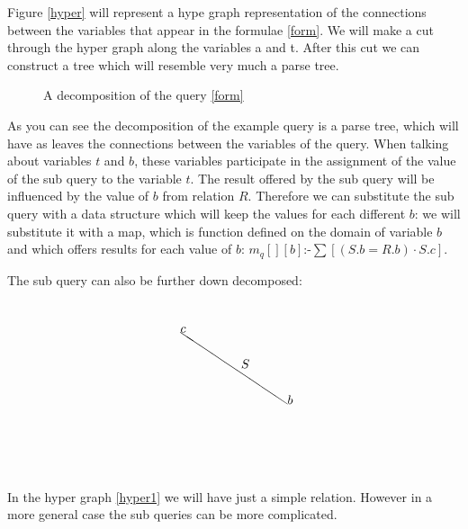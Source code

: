 \documentclass[12pt]{article}
\begin{document}
Figure \ref{hyper} will represent a hype graph representation of the connections between the variables that appear in the formulae \ref{form}. We will make a cut through the hyper graph along the variables a and t. After this cut we can construct a tree which will resemble very much a parse tree.

\begin{figure}[htbp]
\begin{center}
\usetikzlibrary{fit}
\end{center}
\caption{A decomposition of the query \ref{form}}
\label{figtree}
\end{figure}

As you can see the decomposition of the example query is a parse tree, which will have as leaves the connections between the variables of the query. When talking about variables $t$ and $b$, these variables participate in the assignment of the value of the sub query to the variable $t$. The result offered by the sub query will be influenced by the value of $b$ from relation $R$. Therefore we can substitute the sub query with a data structure which will keep the values for each different $b$: we will substitute it with a map, which is function defined on the domain of variable $b$ and which offers results for each value of $b$: $m_q[][b]\mbox{:-}\sum[(S.b=R.b)\cdot S.c]$.

The sub query can also be further down decomposed:
\begin{align}
\label{hyper1}
\setlength{\unitlength}{1mm}
\begin{picture}(50,50)
\put(40,20){\line(-3,2){30}}
\put(40,20){$b$}
\put(10,40){$c$}
\put(27,30){$S$}
\end{picture}
\end{align}
In the hyper graph \ref{hyper1} we will have just a simple relation. However in a more general case the sub queries can be more complicated.
\end{document}
